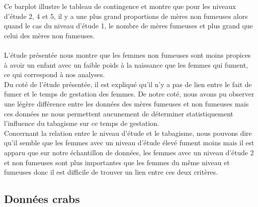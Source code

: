 \documentclass[a4paper, 10pt]{article}
\begin{document}
Ce barplot illustre le tableau de contingence et montre que pour les niveaux d'\'etude 2, 4 et 5, il y a une plus grand proportions de
m\`eres non fumeuses alors quand le cas du niveau d'\'etude 1, le nombre de m\`eres fumeuses et plus grand que celui
des m\`eres non fumeuses.\\ \\
L'\'etude pr\'esent\'ee nous montre que les femmes non fumeuses sont moins propices \`a avoir un enfant avec un faible poids à la naissance
que les femmes qui fument, ce qui correspond à nos analyses.\\
Du cot\'e de l'\'etude pr\'esent\'ee, il est expliqu\'e qu'il n'y a pas de lien entre le fait de fumer et le temps de gestation des femmes.
De notre cot\'e, nous avons pu observer une l\'eg\`ere diff\'erence entre les donn\'ees des m\`eres fumeuses et non fumeuses mais ces donn\'ees
ne nous permettent aucunement de d\'eterminer statistiquement l'influence du tabagisme sur ce temps de gestation.\\
Concernant la relation entre le niveau d'\'etude et le tabagisme, nous pouvons dire qu'il semble que les femmes avec un niveau d'\'etude
\'elev\'e fument moins mais il est apparu que sur notre \'echantillon de donn\'ees, les femmes avec un niveau d'\'etude 2 et non fumeuses
sont plus importantes que les femmes du m\^eme niveau et fumeuses donc il est difficile de trouver un lien entre ces deux crit\`eres.

\subsection{Donn\'ees crabs}
\end{document}
